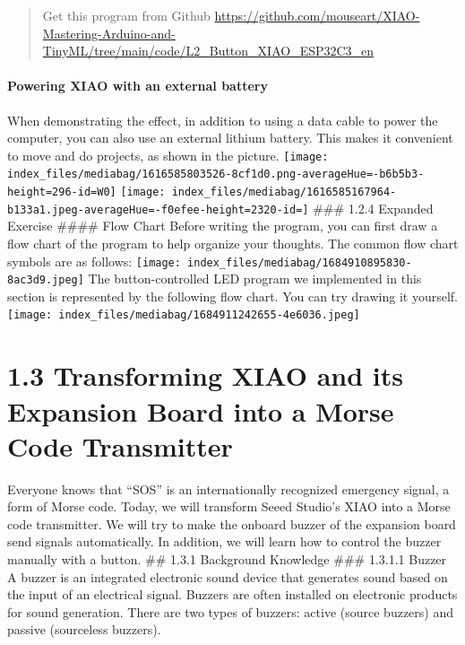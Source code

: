 \documentclass[
  letterpaper,
  DIV=11,
  numbers=noendperiod]{scrreprt}
\begin{document}
\begin{quote}
Get this program from Github
\url{https://github.com/mouseart/XIAO-Mastering-Arduino-and-TinyML/tree/main/code/L2_Button_XIAO_ESP32C3_en}
\end{quote}

\hypertarget{powering-xiao-with-an-external-battery}{%
\subsubsection*{Powering XIAO with an external
battery}\label{powering-xiao-with-an-external-battery}}

When demonstrating the effect, in addition to using a data cable to
power the computer, you can also use an external lithium battery. This
makes it convenient to move and do projects, as shown in the picture.
\texttt{[image: index\_files/mediabag/1616585803526-8cf1d0.png-averageHue=-b6b5b3-height=296-id=W0]}
\texttt{[image: index\_files/mediabag/1616585167964-b133a1.jpeg-averageHue=-f0efee-height=2320-id=]}
\#\#\# 1.2.4 Expanded Exercise \#\#\#\# Flow Chart Before writing the
program, you can first draw a flow chart of the program to help organize
your thoughts. The common flow chart symbols are as follows:
\texttt{[image: index\_files/mediabag/1684910895830-8ac3d9.jpeg]} The
button-controlled LED program we implemented in this section is
represented by the following flow chart. You can try drawing it
yourself.
\texttt{[image: index\_files/mediabag/1684911242655-4e6036.jpeg]}


\hypertarget{transforming-xiao-and-its-expansion-board-into-a-morse-code-transmitter}{%
\chapter*{1.3 Transforming XIAO and its Expansion Board into a Morse
Code
Transmitter}\label{transforming-xiao-and-its-expansion-board-into-a-morse-code-transmitter}}


Everyone knows that ``SOS'' is an internationally recognized emergency
signal, a form of Morse code. Today, we will transform Seeed Studio's
XIAO into a Morse code transmitter. We will try to make the onboard
buzzer of the expansion board send signals automatically. In addition,
we will learn how to control the buzzer manually with a button. \#\#
1.3.1 Background Knowledge \#\#\# 1.3.1.1 Buzzer A buzzer is an
integrated electronic sound device that generates sound based on the
input of an electrical signal. Buzzers are often installed on electronic
products for sound generation. There are two types of buzzers: active
(source buzzers) and passive (sourceless buzzers).
\end{document}
